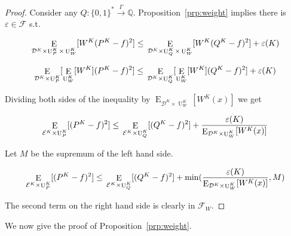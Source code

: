 \documentclass{article}
\numberwithin{equation}{section}
\theoremstyle{definition}
\theoremstyle{plain}
\newcommand{\Bool}{\{0,1\}}
\newcommand{\Words}{{\Bool^*}}
\DeclareMathOperator{\E}{E}
\DeclareMathOperator{\Un}{U}
\newcommand{\Rats}{\mathbb{Q}}
\newcommand{\Dist}{\mathcal{D}}
\newcommand{\Fall}{\mathcal{F}}
\newcommand{\Scheme}{\xrightarrow{\Gamma}}
\begin{document}
\begin{proof}

Consider any $Q: \Words \Scheme \Rats$. Proposition~\ref{prp:weight} implies there is $\varepsilon \in \Fall$ s.t.

$$\E_{\Dist^{K} \times \Un_P^{K} \times \Un_W^{K}}[W^{K}(P^{K} - f)^2] \leq \\ \E_{\Dist^{K} \times \Un_Q^{K} \times \Un_W^{K}}[W^{K}(Q^{K} - f)^2] + \varepsilon(K)$$

$$\E_{\Dist^{K} \times \Un_P^{K}}[\E_{\Un_W^{K}}[W^{K}](P^{K} - f)^2] \leq \\ \E_{\Dist^{K} \times \Un_Q^{K}}[\E_{\Un_W^{K}}[W^{K}](Q^{K} - f)^2] + \varepsilon(K)$$

Dividing both sides of the inequality by $\E_{\Dist^{K} \times \Un_W^{K}}[W^{K}(x)]$ we get

$$\E_{\mathcal{E}^{K} \times \Un_P^{K}}[(P^{K} - f)^2] \leq \\ \E_{\mathcal{E}^{K} \times \Un_Q^{K}}[(Q^{K} - f)^2] + \frac{\varepsilon(K)}{\E_{\Dist^{K} \times \Un_W^{K}}[W^{K}(x)]}$$

Let $M$ be the supremum of the left hand side.

$$\E_{\mathcal{E}^{K} \times \Un_P^{K}}[(P^{K} - f)^2] \leq \\ \E_{\mathcal{E}^{K} \times \Un_Q^{K}}[(Q^{K} - f)^2] + \min(\frac{\varepsilon(K)}{\E_{\Dist^{K} \times \Un_W^{K}}[W^{K}(x)]},M)$$

The second term on the right hand side is clearly in $\Fall_W$.
\end{proof}

We now give the proof of Proposition~\ref{prp:weight}.
\end{document}
